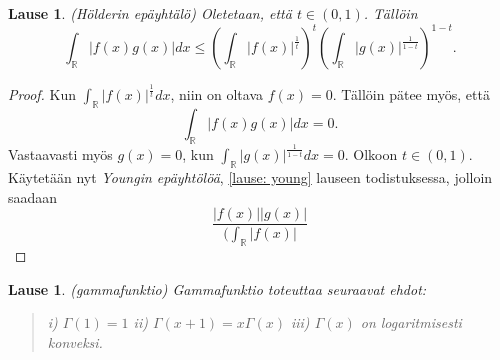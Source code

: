 \documentclass[12pt]{article}
\theoremstyle{definition}
\theoremstyle{plain}
\newtheorem{lause}[maar]{Lause}
\numberwithin{equation}{section}
\begin{document}
\begin{lause} \label{lause: hölder}
(Hölderin epäyhtälö) Oletetaan, että $t \in (0,1)$. Tällöin 
\begin{equation}
    \int_{\mathbb{R}} |f(x)g(x)|dx \le \left( \int_{\mathbb{R}} |f(x)|^{\frac{1}{t}} \right)^{t}\left( \int_{\mathbb{R}} |g(x)|^{\frac{1}{1-t}}\right)^{1-t}.
\end{equation}
\end{lause}
\begin{proof}
Kun $\int_\mathbb{R}|f(x)|^{\frac{1}{t}}dx$, niin on oltava $f(x)=0$. Tällöin pätee myös, että
\begin{equation}
    \int_{\mathbb{R}} |f(x)g(x)|dx=0.
\end{equation}
Vastaavasti myös $g(x)=0$, kun $\int_{\mathbb{R}}|g(x)|^{\frac{1}{1-t}}dx=0$. \newline
Olkoon $t\in(0,1).$ Käytetään nyt \emph{Youngin epäyhtölöä}, \eqref{lause: young} lauseen todistuksessa, jolloin saadaan
\begin{equation}
    \frac{|f(x)||g(x)|}{(\int_{\mathbb{R}}|f(x)|}
\end{equation}

\end{proof}

\begin{lause}
(gammafunktio) Gammafunktio  toteuttaa seuraavat ehdot:
\begin{quote}
    i) $\Gamma(1)=1$ \newline
    ii) $\Gamma(x+1)=x\Gamma(x)$ \newline
    iii) $\Gamma(x)$ on logaritmisesti konveksi.
\end{quote}
\end{lause}
\end{document}
